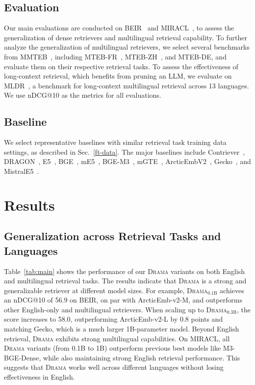 \documentclass[]{fairmeta}
\newcommand{\ourmodel}{\textsc{Drama}}
\begin{document}
\subsection{Evaluation}
Our main evaluations are conducted on BEIR~\citep{thakur2021beir} and MIRACL~\citep{miracl}, to assess the generalization of dense retrievers and multilingual retrieval capability.
To further analyze the generalization of multilingual retrievers, we select several benchmarks from MMTEB~\citep{muennighoff2022mteb,enevoldsen2025mmteb}, including MTEB-FR~\citep{ciancone2024mtebfr}, MTEB-ZH~\citep{xiao2024cpack}, and MTEB-DE, and evaluate them on their respective retrieval tasks.
To assess the effectiveness of long-context retrieval, which benefits from pruning an LLM, we evaluate on MLDR~\citep{chen-etal-2024-m3}, a benchmark for long-context multilingual retrieval across 13 languages.
We use nDCG@10 as the metrics for all evaluations.



\subsection{Baseline}
We select representative baselines with similar retrieval task training data settings, as described in Sec.~\ref{ft-data}.
The major baselines include Contriever~\citep{izacard2022unsup}, DRAGON~\citep{lin-etal-2023-train}, E5~\citep{wang2024text}, BGE~\citep{xiao2024cpack}, mE5~\citep{wang2024me5}, BGE-M3~\citep{chen-etal-2024-m3}, mGTE~\citep{zhang2024mgte}, ArcticEmbV2~\citep{yu2024arcticembed}, Gecko~\citep{lee2024gecko}, and MistralE5~\citep{wang-etal-2024-improving-text}.


\section{Results}
\subsection{Generalization across Retrieval Tasks and Languages}
Table~\ref{tab:main} shows the performance of our \ourmodel{} variants on both English and multilingual retrieval tasks.
The results indicate that \ourmodel{} is a strong and generalizable retriever at different model sizes.
For example, \ourmodel{}$_\text{0.1B}$ achieves an nDCG@10 of 56.9 on BEIR, on par with ArcticEmb-v2-M, and outperforms other English-only and multilingual retrievers.
When scaling up to \ourmodel{}$_\text{0.3B}$, the score increases to 58.0, outperforming ArcticEmb-v2-L by 0.8 points and matching Gecko, which is a much larger 1B-parameter model.
Beyond English retrieval, \ourmodel{} exhibits strong multilingual capabilities.
On MIRACL, all \ourmodel{} variants (from 0.1B to 1B) outperform previous best models like M3-BGE-Dense, while also maintaining strong English retrieval performance.
This suggests that \ourmodel{} works well across different languages without losing effectiveness in English.
\end{document}
